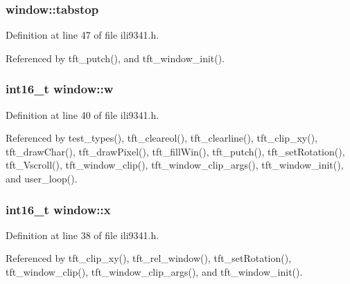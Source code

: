 \subsubsection[{\texorpdfstring{tabstop}{tabstop}}]{ window\+::tabstop}\hypertarget{structwindow_a88d2836d45dd428d8fadfd703f0f965f}{}\label{structwindow_a88d2836d45dd428d8fadfd703f0f965f}


Definition at line 47 of file ili9341.\+h.



Referenced by tft\+\_\+putch(), and tft\+\_\+window\+\_\+init().

\subsubsection[{\texorpdfstring{w}{w}}]{\setlength{\rightskip}{0pt plus 5cm}int16\+\_\+t window\+::w}\hypertarget{structwindow_ad89fdeb11ce94e2e7501f7290372d6ae}{}\label{structwindow_ad89fdeb11ce94e2e7501f7290372d6ae}


Definition at line 40 of file ili9341.\+h.



Referenced by test\+\_\+types(), tft\+\_\+cleareol(), tft\+\_\+clearline(), tft\+\_\+clip\+\_\+xy(), tft\+\_\+draw\+Char(), tft\+\_\+draw\+Pixel(), tft\+\_\+fill\+Win(), tft\+\_\+putch(), tft\+\_\+set\+Rotation(), tft\+\_\+\+Vscroll(), tft\+\_\+window\+\_\+clip(), tft\+\_\+window\+\_\+clip\+\_\+args(), tft\+\_\+window\+\_\+init(), and user\+\_\+loop().

\subsubsection[{\texorpdfstring{x}{x}}]{\setlength{\rightskip}{0pt plus 5cm}int16\+\_\+t window\+::x}\hypertarget{structwindow_a879b99940dfc34772f0257f54c67b817}{}\label{structwindow_a879b99940dfc34772f0257f54c67b817}


Definition at line 38 of file ili9341.\+h.



Referenced by tft\+\_\+clip\+\_\+xy(), tft\+\_\+rel\+\_\+window(), tft\+\_\+set\+Rotation(), tft\+\_\+window\+\_\+clip(), tft\+\_\+window\+\_\+clip\+\_\+args(), and tft\+\_\+window\+\_\+init().

